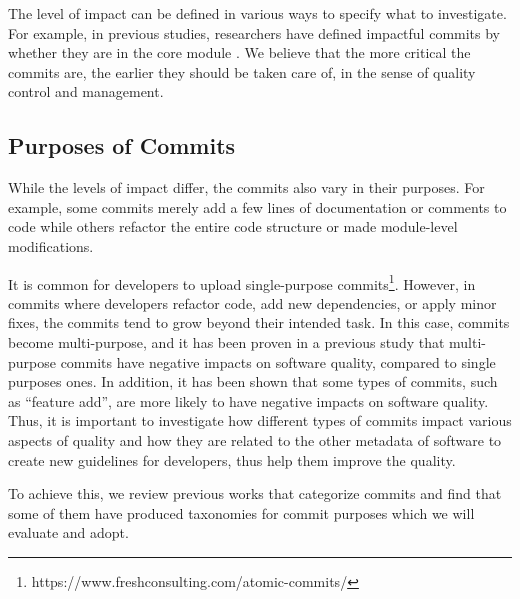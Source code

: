The level of impact can be defined in various ways to specify what to investigate. For example, in previous studies, researchers have defined impactful commits by whether they are in the core module \cite{pooyan_esem, pooyan_qrs}.
We believe that the more critical the commits are, the earlier they should be taken care of, in the sense of quality control and management. 


\subsection{Purposes of Commits}
While the levels of impact differ, the commits also vary in their purposes.
For example, some commits merely add a few lines of documentation or comments to code while others refactor the entire code structure or made module-level modifications.


It is common for developers to upload single-purpose commits\footnote{https://www.freshconsulting.com/atomic-commits/}. 
However, in commits where developers refactor code, add new dependencies, or apply minor fixes, the commits tend to grow beyond their intended task.
In this case, commits become multi-purpose, and it has been proven in a previous study \cite{qrs2020} that multi-purpose commits have negative impacts on software quality, compared to single purposes ones.
In addition, it has been shown that some types of commits, such as ``feature add'', are more likely to have negative impacts on software quality.
Thus, it is important to investigate how different types of commits impact various aspects of quality and how they are related to the other metadata of software to create new guidelines for developers, thus help them improve the quality.

To achieve this, we review previous works that categorize commits and find that some of them have produced taxonomies for commit purposes \cite{Hindle_cate,alali_2008,Dragan,Swanson, Mauczka, Hindle_auto,qrs2020} which we will evaluate and adopt.



